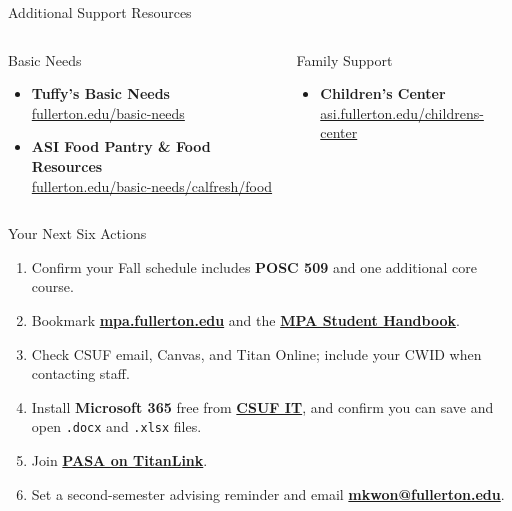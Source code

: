 \documentclass[10pt,aspectratio=169]{beamer}
\begin{document}
\begin{frame}{Additional Support Resources}
\begin{columns}[T,onlytextwidth]
  \begin{block}{Basic Needs}
    \begin{itemize}\setlength{\itemsep}{4pt}
      \item \textbf{Tuffy's Basic Needs}\\[-2pt]
        \footnotesize\href{https://www.fullerton.edu/basic-needs/}{fullerton.edu/basic-needs}
      \item \textbf{ASI Food Pantry \& Food Resources}\\[-2pt]
        \footnotesize\href{https://www.fullerton.edu/basic-needs/calfresh/food.html}{fullerton.edu/basic-needs/calfresh/food}
    \end{itemize}
  \end{block}

  \begin{block}{Family Support}
    \begin{itemize}\setlength{\itemsep}{4pt}
      \item \textbf{Children's Center}\\[-2pt]
        \footnotesize\href{https://asi.fullerton.edu/childrens-center}{asi.fullerton.edu/childrens-center}
    \end{itemize}
  \end{block}
\end{columns}
\end{frame}

\begin{frame}{Your Next Six Actions}
\large
\begin{enumerate}\setlength{\itemsep}{2pt}
  \item Confirm your Fall schedule includes \textbf{POSC 509} and one additional core course.
  \item Bookmark \href{https://mpa.fullerton.edu}{\textbf{mpa.fullerton.edu}} and the \href{https://csuf-mpa.github.io/mpa_handbook/}{\textbf{MPA Student Handbook}}.
  \item Check CSUF email, Canvas, and Titan Online; include your CWID when contacting staff.
  \item Install \textbf{Microsoft 365} free from \href{https://www.fullerton.edu/it/services/software/}{\textbf{CSUF IT}}, and confirm you can save and open \texttt{.docx} and \texttt{.xlsx} files.
  \item Join \href{https://fullerton.campuslabs.com/engage/organization/pasa}{\textbf{PASA on TitanLink}}.
  \item Set a second-semester advising reminder and email \href{mailto:mkwon@fullerton.edu}{\textbf{mkwon@fullerton.edu}}.
\end{enumerate}
\end{frame}
\end{document}
